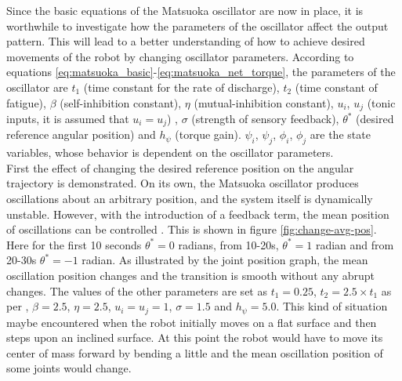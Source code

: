 \documentclass[12pt,twoside]{article}
\theoremstyle{plain}
\theoremstyle{definition}
\theoremstyle{remark}
\newcommand{\forceindent}{\leavevmode{\parindent=2em\indent}}
\begin{document}
\forceindent Since the basic equations of the Matsuoka oscillator are now in place, it is worthwhile to investigate how the parameters of the oscillator affect the output pattern. This will lead to a better understanding of how to achieve desired movements of the robot by changing oscillator parameters. According to equations \ref{eq:matsuoka_basic}-\ref{eq:matsuoka_net_torque}, the parameters of the oscillator are $t_1$ (time constant for the rate of discharge), $t_2$ (time constant of fatigue), $\beta$ (self-inhibition constant), $\eta$ (mutual-inhibition constant), $u_i$, $u_j$ (tonic inputs, it is assumed that $u_i=u_j$) , $\sigma$ (strength of sensory feedback),  $\theta^*$ (desired reference angular position) and $h_{\psi}$ (torque gain). $\psi_i$, $\psi_j$, $\phi_i$, $\phi_j$ are the state variables, whose behavior is dependent on the oscillator parameters.\\ 
\forceindent First the effect of changing the desired reference position on the angular trajectory is demonstrated. On its own, the Matsuoka oscillator produces oscillations about an arbitrary position, and the system itself is dynamically unstable. However, with the introduction of a feedback term, the mean position of oscillations can be controlled \cite{Ronsse2009}. This is shown in figure \ref{fig:change-avg-pos}. Here for the first 10 seconds $\theta^*=0$ radians, from 10-20s, $\theta^*=1$ radian and from 20-30s $\theta^*=-1$ radian. As illustrated by the joint position graph, the mean oscillation position changes and the transition is smooth without any abrupt changes. The values of the other parameters are set as $t_1=0.25$, $t_2= 2.5 \times t_1$ as per \cite{Ronsse2009}, $\beta=2.5$,  $\eta=2.5$, $u_i=u_j=1$, $\sigma=1.5$ and $h_{\psi}=5.0$. This kind of situation maybe encountered when the robot initially moves on a flat surface and then steps upon an inclined surface. At this point the robot would have to move its center of mass forward by bending a little and the mean oscillation position of some joints would change.
\end{document}

